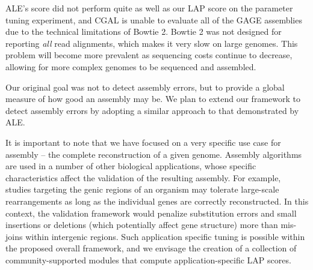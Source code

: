 ALE's score did not perform quite as well as our LAP score on the parameter tuning experiment, and
CGAL is unable to evaluate all of the GAGE assemblies due to the technical limitations of Bowtie 2.
Bowtie 2 was not designed for reporting \emph{all} read alignments, which makes it very slow on large genomes. This problem will become more prevalent as sequencing costs continue to decrease, allowing for more complex genomes to be sequenced and assembled.

Our original goal was not to detect assembly errors, but to provide a global measure of how good an assembly may be.
We plan to extend our framework to detect assembly errors by adopting a similar approach to that demonstrated by ALE.

It is important to note that we have focused on a very specific use
case for assembly -- the complete reconstruction of a given genome.
Assembly algorithms are used in a number of other biological
applications, whose specific characteristics affect the validation of
the resulting assembly.  For example, studies targeting the genic
regions of an organism may tolerate large-scale rearrangements as long
as the individual genes are correctly reconstructed. In this context,
the validation framework would penalize substitution errors and small
insertions or deletions (which potentially affect gene structure) more
than mis-joins within intergenic regions.  Such application specific
tuning is possible within the proposed overall framework, and we
envisage the creation of a collection of community-supported modules
that compute application-specific LAP scores.

